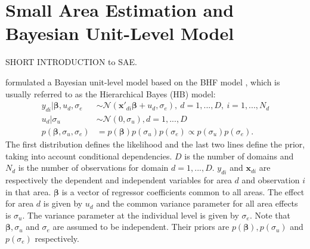 \section{Small Area Estimation and Bayesian Unit-Level Model}

SHORT INTRODUCTION to SAE.    \cite{rao_small_2015}

\cite{molina_small_2014} formulated a Bayesian unit-level model based on the BHF model \citep{battese_error_1988}, which is usually referred to as the Hierarchical Bayes (HB) model:
\begin{equation}
    \label{eq:hb_rao}
	\begin{split}
	y_{di} |\boldsymbol \beta, u_d, \sigma_e & \sim \mathcal N(\boldsymbol{x'}_{di} \boldsymbol{\beta}+ u_d, \sigma_e),\ d = 1, ..., D,\ i = 1, ..., N_d \\
	u_d | \sigma_u & \sim \mathcal N(0, \sigma_u), d = 1, ..., D \\
	p(\boldsymbol \beta, \sigma_u, \sigma_e) & = p(\boldsymbol \beta) p(\sigma_u)p(\sigma_e) \propto p(\sigma_u)p(\sigma_e).
	\end{split}
\end{equation}
The first distribution defines the likelihood and the last two lines define the prior, taking into account conditional dependencies.
$D$ is the number of domains and $N_d$ is the number of observations for domain $d = 1, ..., D$. $y_{di}$ and $\boldsymbol{x}_{di}$ are respectively the dependent and independent variables for area $d$ and observation $i$ in that area.
$\boldsymbol \beta$ is a vector of regressor coefficients common to all areas.
The effect for area $d$ is given by $u_d$ and the common variance parameter for all area effects is $\sigma_u$.
The variance parameter at the individual level is given by $\sigma_e$.
Note that $\boldsymbol \beta, \sigma_u$ and $\sigma_e$ are assumed to be independent.
Their priors are $p(\boldsymbol \beta), p(\sigma_u)$ and $p(\sigma_e)$ respectively.



